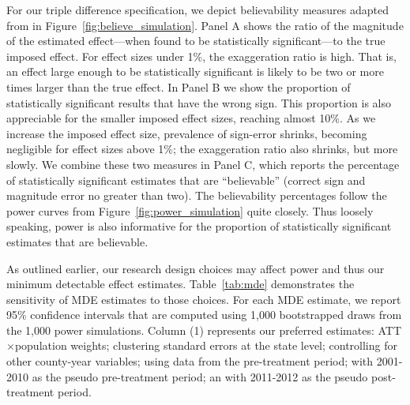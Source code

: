 \documentclass[12pt]{article}%
\begin{document}
For our triple difference specification, we depict believability measures adapted from \citet{Gelman2014} in Figure~\ref{fig:believe_simulation}. 
Panel A shows the ratio of the magnitude of the estimated effect---when found to be statistically significant---to the true imposed effect. 
For effect sizes under 1\%, the exaggeration ratio is high.  
That is, an effect large enough to be statistically significant is likely to be two or more times larger than the true effect.  
In Panel B we show the proportion of statistically significant results that have the wrong sign.  
This proportion is also appreciable for the smaller imposed effect sizes, reaching almost 10\%. 
As we increase the imposed effect size, prevalence of sign-error shrinks, becoming negligible for effect sizes above 1\%; the exaggeration ratio also shrinks, but more slowly.
We combine these two measures in Panel C, which reports the percentage of statistically significant estimates that are ``believable'' (correct sign and magnitude error no greater than two). 
The believability percentages follow the power curves from Figure~\ref{fig:power_simulation} quite closely. 
Thus loosely speaking, power is also informative for the proportion of statistically significant estimates that are believable.  


As outlined earlier, our research design choices may affect power and thus our minimum detectable effect estimates. 
Table~\ref{tab:mde} demonstrates the sensitivity of MDE estimates to those choices. 
For each MDE estimate, we report 95\% confidence intervals that are computed using 1,000 bootstrapped draws from the 1,000 power simulations.
Column (1) represents our preferred estimates: ATT$\times$population weights; clustering standard errors  at the state level; controlling for other county-year variables; using data from the pre-treatment period; with 2001-2010 as the pseudo pre-treatment period; an with 2011-2012 as the pseudo post-treatment period. 
\end{document}
